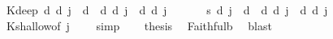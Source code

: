 \begin{isabellebody}
%
\endisadelimproof
\isanewline
{}\isamarkupfalse%
\ K{\isacharunderscore}{\kern0pt}deep{\isacharcolon}{\kern0pt}\ {\isachardoublequoteopen}{\isasymTurnstile}\isactrlsup d\ {\isacharparenleft}{\kern0pt}{\isasymB}\isactrlsup d\ j\ {\isacharparenleft}{\kern0pt}{\isasymphi}\ {\isasymsupset}\isactrlsup d\ {\isasympsi}{\isacharparenright}{\kern0pt}\ {\isasymsupset}\isactrlsup d\ {\isacharparenleft}{\kern0pt}{\isasymB}\isactrlsup d\ j\ {\isasymphi}\ {\isasymsupset}\isactrlsup d\ {\isasymB}\isactrlsup d\ j\ {\isasympsi}{\isacharparenright}{\kern0pt}{\isacharparenright}{\kern0pt}{\isachardoublequoteclose}\isanewline
%
\isadelimproof
%
\endisadelimproof
%
\isatagproof
{}\isamarkupfalse%
\ {\isacharminus}{\kern0pt}\isanewline
\ \ \isamarkupfalse%
\ {\isachardoublequoteopen}{\isasymTurnstile}\isactrlsup s\ {\isasymlparr}{\isasymB}\isactrlsup d\ j\ {\isacharparenleft}{\kern0pt}{\isasymphi}\ {\isasymsupset}\isactrlsup d\ {\isasympsi}{\isacharparenright}{\kern0pt}\ {\isasymsupset}\isactrlsup d\ {\isacharparenleft}{\kern0pt}{\isasymB}\isactrlsup d\ j\ {\isasymphi}\ {\isasymsupset}\isactrlsup d\ {\isasymB}\isactrlsup d\ j\ {\isasympsi}{\isacharparenright}{\kern0pt}{\isasymrparr}{\isachardoublequoteclose}\isanewline
\ \ \ \ \isamarkupfalse%
\ K{\isacharunderscore}{\kern0pt}shallow{\isacharbrackleft}{\kern0pt}of\ j\ {\isachardoublequoteopen}{\isasymlparr}{\isasymphi}{\isasymrparr}{\isachardoublequoteclose}\ {\isachardoublequoteopen}{\isasymlparr}{\isasympsi}{\isasymrparr}{\isachardoublequoteclose}{\isacharbrackright}{\kern0pt}\ \isamarkupfalse%
\ simp\isanewline
\ \ \isamarkupfalse%
\ {\isacharquery}{\kern0pt}thesis\ \isamarkupfalse%
\ Faithful{}b\ \isamarkupfalse%
\ blast\isanewline
{}\isamarkupfalse%
%
\endisatagproof
{\isafoldproof}%
%
\isadelimproof
\isanewline
%
\endisadelimproof
\isanewline
%
\isadelimtheory
\isanewline
%
\endisadelimtheory
%
\isatagtheory
{}\isamarkupfalse%
%
\endisatagtheory
{\isafoldtheory}%
%
\isadelimtheory
%
\endisadelimtheory
%
\end{isabellebody}%
\endinput
